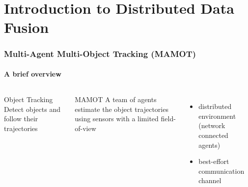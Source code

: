 \section{Introduction to Distributed Data Fusion}

\begin{frame}
	\frametitle{Multi-Agent Multi-Object Tracking (MAMOT)}
	\framesubtitle{A brief overview}
	
	\begin{columns}
		\centering
		
		\begin{block}{Object Tracking}
			Detect objects and follow their trajectories
		\end{block}
		
		\begin{block}{MAMOT}
			A team of agents estimate the object trajectories using sensors with a limited field-of-view
		\end{block}
		
		\begin{itemize}
			\item distributed environment (network connected agents)
			\item best-effort communication channel
		\end{itemize}
		
		\centering
		
	\end{columns}
\end{frame}

